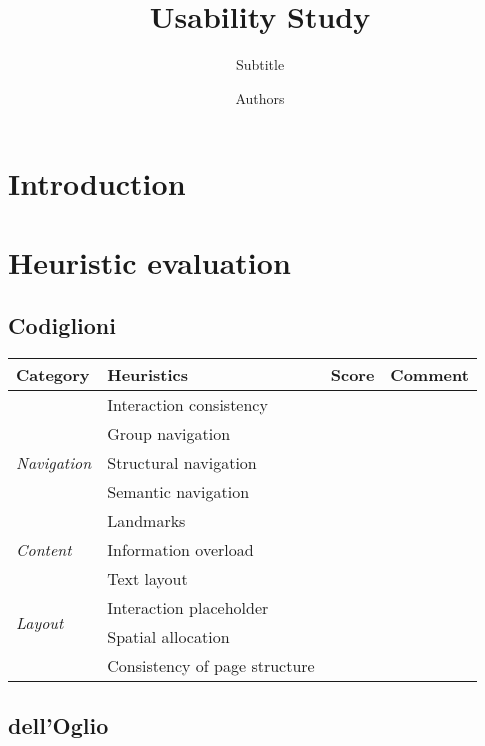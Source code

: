 \documentclass[a4paper, 11pt, parskip=half]{scrreprt}
\title{Usability Study}
\subtitle{Subtitle}
\author{Authors}
\begin{document}
\maketitle
\tableofcontents
\newpage
{}



\chapter{Introduction}


\chapter{Heuristic evaluation}

\section{Codiglioni}

\begin{center}
    \def\arraystretch{1.3}
    \begin{tabular}{|l|l|l|m{7cm}|}
        \hline
        \textbf{Category} & \textbf{Heuristics} & \textbf{Score} & \textbf{Comment} \\ \hline
        \multirow{5}{*}{\textit{Navigation}} & Interaction consistency & & \\ \cline{2-4}
        & Group navigation & & \\ \cline{2-4}
        & Structural navigation & & \\ \cline{2-4}
        & Semantic navigation & & \\ \cline{2-4}
        & Landmarks & & \\ \hline
        \multirow{1}{*}{\textit{Content}} & Information overload & & \\ \hline
        \multirow{4}{*}{\textit{Layout}} & Text layout & & \\ \cline{2-4}
        & Interaction placeholder & & \\ \cline{2-4}
        & Spatial allocation & & \\ \cline{2-4}
        & Consistency of page structure & & \\ \hline
    \end{tabular}
\end{center}

\section{dell'Oglio}
\end{document}
